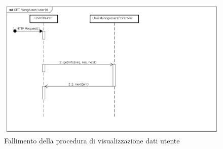 \begin{itemize}
\label{Fallimento della procedura di visualizzazione dati utente}
\begin{figure}[ht]
	\centering
	\includegraphics[scale=0.40]{UML/DiagrammiDiSequenza/Back-end/GET_LangUserUseridFailure.png}
	\caption{Fallimento della procedura di visualizzazione dati utente}
\end{figure}

\FloatBarrier
\end{itemize}

